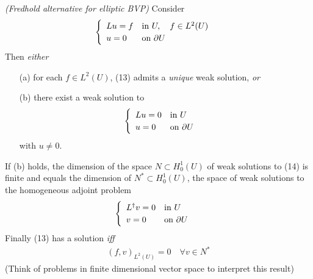 \documentclass[12pt,a4paper]{report}
\begin{document}
\thm \emph{(Fredhold alternative for elliptic BVP)} Consider
\begin{align}
\begin{cases}
\begin{array}{ll}
Lu = f & \text{in } U, \quad f\in L^2(U) \\
u = 0 & \text{on } \partial U
\end{array}
\end{cases} \label{14}
\end{align}
Then \emph{either} \begin{itemize}
\item[(a)] for each $f\in L^2(U)$, (13) admits a \emph{unique} weak solution, \emph{or}
\item[(b)] there exist a weak solution to
\begin{align}
\begin{cases}
\begin{array}{ll}
Lu = 0 & \text{in } U \\
u = 0 & \text{on } \partial U
\end{array}
\end{cases} \label{15}
\end{align}
with $u \neq 0$.
\end{itemize}
If (b) holds, the dimension of the space $N \subset H_0^1(U)$ of weak solutions to (14) is finite and equals the dimension of $N^* \subset H_0^1(U)$, the space of weak solutions to the homogeneous adjoint problem
\begin{align*}
\begin{cases}
\begin{array}{ll}
L^{\dagger}v = 0 & \text{in } U \\
v = 0 & \text{on } \partial U
\end{array}
\end{cases}
\end{align*}
\quad Finally (13) has a solution \emph{iff}
\begin{align*}
(f,v)_{L^2(U)} = 0 \quad \forall v\in N^*
\end{align*}
(Think of problems in finite dimensional vector space to interpret this result)
\end{document}
